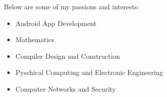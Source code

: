     \noindent
    Below are some of my passions and interests:
    \begin{itemize}
        \item Android App Development
        \item Mathematics
        \item Compiler Design and Construction
        \item Pyschical Computing and Electronic Engineering
        \item Computer Networks and Security
    \end{itemize}


